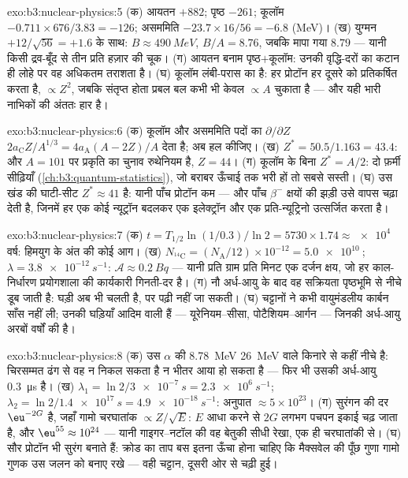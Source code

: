 \begin{solution}{exo:b3:nuclear-physics:5}
(क) आयतन $+882$; पृष्ठ $-261$; कूलॉम $-0.711\times676/3.83
= -126$; असममिति $-23.7\times16/56 = -6.8$ (\unit{MeV})। (ख)
युग्मन $+12/\sqrt{56} = +1.6$ के साथ: $B \approx \qty{490}{MeV}$,
$B/A = 8.76$, जबकि मापा गया $8.79$ --- यानी किसी द्रव-बूँद से तीन
प्रति हज़ार की चूक। (ग) आयतन बनाम पृष्ठ$+$कूलॉम: उनकी वृद्धि-दरों का
कटान ही लोहे पर वह अधिकतम तराशता है।
(घ) कूलॉम लंबी-परास का है: हर प्रोटॉन हर दूसरे को प्रतिकर्षित करता है,
$\propto Z^2$, जबकि संतृप्त होता प्रबल बल कभी भी केवल
$\propto A$ चुकाता है --- और यही भारी नाभिकों की अंततः हार है।
\end{solution}

\begin{solution}{exo:b3:nuclear-physics:6}
(क) कूलॉम और असममिति पदों का $\partial/\partial Z$
$2a_{\text{C}}Z/A^{1/3} = 4a_{\text{A}}(A - 2Z)/A$ देता है; अब हल कीजिए।
(ख) $Z^* = 50.5/1.163 = 43.4$: और $A = 101$ पर प्रकृति का चुनाव
रुथेनियम है, $Z = 44$। (ग) कूलॉम के बिना $Z^* = A/2$: दो फ़र्मी
सीढ़ियाँ (\cref{ch:b3:quantum-statistics}), जो बराबर ऊँचाई तक भरी
हों तो सबसे सस्ती। (घ) उस खंड की घाटी-सीट $Z^* \approx 41$ है:
यानी पाँच प्रोटॉन कम --- और पाँच $\beta^-$ क्षयों की झड़ी उसे वापस
चढ़ा देती है, जिनमें हर एक कोई न्यूट्रॉन बदलकर एक इलेक्ट्रॉन और एक
प्रति-न्यूट्रिनो उत्सर्जित करता है।
\end{solution}

\begin{solution}{exo:b3:nuclear-physics:7}
(क) $t = T_{1/2}\ln(1/0.3)/\ln2 = 5730\times1.74 \approx
\qty{e4}{}$ वर्ष: हिमयुग के अंत की कोई आग। (ख) $N_{^{14}\text{C}}
= (N_{\text{A}}/12)\times10^{-12} = \qty{5.0e10}{}$; $\lambda =
\qty{3.8e-12}{s^{-1}}$: $\mathcal A \approx \qty{0.2}{Bq}$ ---
यानी प्रति ग्राम प्रति मिनट एक दर्जन क्षय, जो हर काल-निर्धारण
प्रयोगशाला की कार्यकारी गिनती-दर है। (ग) नौ अर्ध-आयु के बाद वह
सक्रियता पृष्ठभूमि से नीचे डूब जाती है: घड़ी अब भी चलती है, पर पढ़ी
नहीं जा सकती। (घ) चट्टानों ने कभी वायुमंडलीय कार्बन साँस नहीं ली;
उनकी घड़ियाँ आदिम वाली हैं --- यूरेनियम--सीसा,
पोटैशियम--आर्गन --- जिनकी अर्ध-आयु अरबों वर्षों की है।
\end{solution}

\begin{solution}{exo:b3:nuclear-physics:8}
(क) उस $\alpha$ की \qty{8.78}{MeV} \qty{26}{MeV} वाले किनारे से कहीं
नीचे है: चिरसम्मत ढंग से वह न निकल सकता है न भीतर आया हो सकता है
--- फिर भी उसकी अर्ध-आयु \qty{0.3}{\micro s} है। (ख)
$\lambda_1 = \ln2/\qty{3e-7}{s} = \qty{2.3e6}{s^{-1}}$;
$\lambda_2 = \ln2/\qty{1.4e17}{s} = \qty{4.9e-18}{s^{-1}}$:
अनुपात $\approx 5\times10^{23}$। (ग) सुरंगन की दर
$\eu^{-2G}$ है, जहाँ गामो चरघातांक $\propto Z/\sqrt E$:
$E$ आधा करने से $2G$ लगभग पचपन इकाई चढ़ जाता है, और
$\eu^{55} \approx 10^{24}$ --- यानी गाइगर--नटॉल की वह बेतुकी
सीधी रेखा, एक ही चरघातांकी से। (घ) सौर प्रोटॉन भी
सुरंग बनाते हैं: क्रोड का ताप बस इतना ऊँचा होना चाहिए कि मैक्सवेल की
पूँछ गुणा गामो गुणक उस जलन को बनाए रखे --- वही चट्टान, दूसरी ओर से
चढ़ी हुई।
\end{solution}


